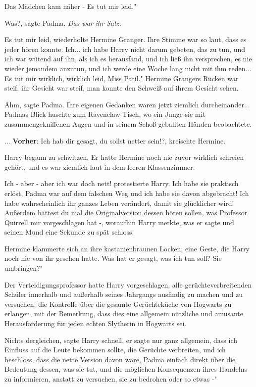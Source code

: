 Das Mädchen kam näher - \glqq Es tut mir leid."

\glqq Was?\grqq{}, sagte Padma. \emph{Das war ihr Satz.}

\glqq Es tut mir leid\grqq{}, wiederholte Hermine Granger. Ihre Stimme war so
laut, dass es jeder hören konnte. \glqq Ich... ich habe Harry nicht darum
gebeten, das zu tun, und ich war wütend auf ihn, als ich es herausfand, und ich
ließ ihn versprechen, es nie wieder jemandem anzutun, und ich werde eine Woche
lang nicht mit ihm reden... Es tut mir wirklich, wirklich leid, Miss Patil."
Hermine Grangers Rücken war steif, ihr Gesicht war steif, man konnte den Schweiß
auf ihrem Gesicht sehen.

\glqq Ähm\grqq{}, sagte Padma. Ihre eigenen Gedanken waren jetzt ziemlich
durcheinander... Padmas Blick huschte zum Ravenclaw-Tisch, wo ein Junge sie mit
zusammengekniffenen Augen und in seinem Schoß geballten Händen beobachtete.

... \textbf{Vorher}: \glqq Ich hab dir gesagt, du sollst netter sein!?\grqq{},
kreischte Hermine.

Harry begann zu schwitzen. Er hatte Hermine noch nie zuvor wirklich schreien
gehört, und es war ziemlich laut in dem leeren Klassenzimmer.

\glqq Ich - aber - aber ich war doch nett!\grqq{} protestierte Harry. \glqq Ich
habe sie praktisch erlöst, Padma war auf dem falschen Weg und ich habe sie davon
abgebracht! Ich habe wahrscheinlich ihr ganzes Leben verändert, damit sie
glücklicher wird! Außerdem hättest du mal die Originalversion dessen hören
sollen, was Professor Quirrell mir vorgeschlagen hat -\grqq{}, woraufhin Harry
merkte, was er sagte und seinen Mund eine Sekunde zu spät schloss.

Hermine klammerte sich an ihre kastanienbraunen Locken, eine Geste, die Harry
noch nie von ihr gesehen hatte. \glqq Was hat er gesagt, was ich tun soll? Sie
umbringen?"

Der Verteidigungsprofessor hatte Harry vorgeschlagen, alle gerüchteverbreitenden
Schüler innerhalb und außerhalb seines Jahrgangs ausfindig zu machen und zu
versuchen, die Kontrolle über die gesamte Gerüchteküche von Hogwarts zu
erlangen, mit der Bemerkung, dass dies eine allgemein nützliche und amüsante
Herausforderung für jeden echten Slytherin in Hogwarts sei.

\glqq Nichts dergleichen\grqq{}, sagte Harry schnell, \glqq er sagte nur ganz
allgemein, dass ich Einfluss auf die Leute bekommen sollte, die Gerüchte
verbreiten, und ich beschloss, dass die nette Version davon wäre, Padma einfach
direkt über die Bedeutung dessen, was sie tut, und die möglichen Konsequenzen
ihres Handelns zu informieren, anstatt zu versuchen, sie zu bedrohen oder so
etwas -"


